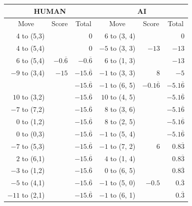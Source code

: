 \begin{appendices}
\begin{table}[H]
    \centering
    \begin{tabular}{rrrrrr}
        \hline
        \multicolumn{3}{c}{HUMAN}        & \multicolumn{3}{c}{AI}     \\ \hline
        \multicolumn{1}{c}{Move}         & \multicolumn{1}{c}{Score} & \multicolumn{1}{c}{Total} & \multicolumn{1}{c}{Move}         & \multicolumn{1}{c}{Score} & \multicolumn{1}{c}{Total} \\ \hline
          4 to (5,3) &       &  0    &   6 to (3, 4) &       &  0    \\ \hline
          4 to (5,4) &       &  0    &   $-5$ to (3, 3) & $-13$       &  $-13$    \\ \hline
          6 to (5,4) & $-0.\overline6$  &  $-0.\overline6$  & $6$ to (1, 3) &        &  $-13$    \\ \hline
          $-9$ to (3,4) & $-15$  &  $-15.\overline6$  & $-1$ to (3, 3) & $8$        &  $-5$    \\ \hline
                        &        &  $-15.\overline6$  & $-1$ to (6, 5) & $-0.1\overline6$        &  $-5.1\overline6$    \\ \hline
          $10$ to (3,2) &        &  $-15.\overline6$  & $10$ to (4, 5) &            &  $-5.1\overline6$    \\ \hline
          $-7$ to (7,2) &        &  $-15.\overline6$  & $8$ to (3, 6) &            &  $-5.1\overline6$    \\ \hline
          $0$ to (1,2) &          &  $-15.\overline6$  & $8$ to (2, 5) &            &  $-5.1\overline6$    \\ \hline
          $0$ to (0,3) &          &  $-15.\overline6$  & $-1$ to (5, 4) &           &  $-5.1\overline6$    \\ \hline
          $-7$ to (5,3) &          &  $-15.\overline6$  & $-1$ to (7, 2) & $6$           &  $0.8\overline3$    \\ \hline
          $2$ to (6,1) &          &  $-15.\overline6$  & $4$ to (1, 4) &               &  $0.8\overline3$    \\ \hline
          $-3$ to (1,2) &          &  $-15.\overline6$  & $0$ to (6, 5) &               &  $0.8\overline3$    \\ \hline
          $-5$ to (4,1) &          &  $-15.\overline6$  & $-1$ to (5, 0) & $-0.5$       &  $0.\overline3$    \\ \hline
          $-11$ to (2,1) &         &  $-15.\overline6$  & $-1$ to (6, 1) &              &  $0.\overline3$    \\ \hline

\end{tabular}
\end{table}
\end{appendices}
